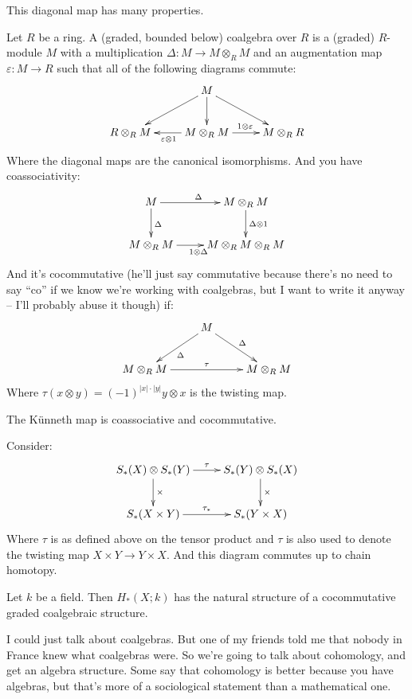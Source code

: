 This diagonal map has many properties.
\begin{definition}
Let $R$ be a ring. A (graded, bounded below) coalgebra over $R$ is a (graded) $R$-module $M$ with a multiplication $\Delta:M\to M\otimes_R M$ and an augmentation map $\varepsilon:M\to R$ such that all of the following diagrams commute:
\begin{equation*}
\xymatrix{ & M\ar[d]\ar[dr]\ar[dl] & \\
R\otimes_R M & M\otimes_R M\ar[l]^{\varepsilon\otimes 1}\ar[r]^{1\otimes\varepsilon} & M\otimes_R R}
\end{equation*}
Where the diagonal maps are the canonical isomorphisms. And you have coassociativity:
\begin{equation*}
\xymatrix{
	M\ar[r]^{\Delta}\ar[d]^{\Delta} & M\otimes_R M\ar[d]^{\Delta\otimes 1}\\
	M\otimes_R M\ar[r]_{1\otimes\Delta} & M\otimes_R M\otimes_R M
}
\end{equation*}
And it's cocommutative (he'll just say commutative because there's no need to say ``co'' if we know we're working with coalgebras, but I want to write it anyway -- I'll probably abuse it though) if:
\begin{equation*}
\xymatrix{
	 & M\ar[dl]^\Delta\ar[dr]^\Delta &\\
	M\otimes_R M\ar[rr]^{\tau} & & M\otimes_R M
}
\end{equation*}
Where $\tau(x\otimes y)=(-1)^{|x|\cdot|y|}y\otimes x$ is the twisting map.
\end{definition}
\begin{example}
The K\"{u}nneth map is coassociative and cocommutative.
\end{example}
Consider:
\begin{equation*}
\xymatrix{S_\ast(X)\otimes S_\ast(Y)\ar[r]^{\tau}\ar[d]^{\times} & S_\ast(Y)\otimes S_\ast(X)\ar[d]^{\times}\\
S_\ast(X\times Y)\ar[r]^{\tau_\ast} & S_\ast(Y\times X)}
\end{equation*}
Where $\tau$ is as defined above on the tensor product and $\tau$ is also used to denote the twisting map $X\times Y\to Y\times X$. And this diagram commutes up to chain homotopy.
\begin{corollary}
Let $k$ be a field. Then $ H_\ast(X;k)$ has the natural structure of a cocommutative graded coalgebraic structure. 
\end{corollary}
I could just talk about coalgebras. But one of my friends told me that nobody in France knew what coalgebras were. So we're going to talk about cohomology, and get an algebra structure. Some say that cohomology is better because you have algebras, but that's more of a sociological statement than a mathematical one.
